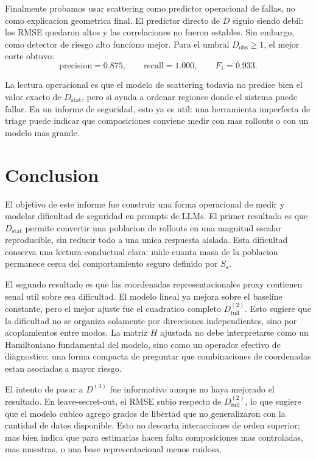 ﻿\documentclass[10pt,twocolumn]{article}
\newcommand{\Dstat}{D_{\mathrm{stat}}}
\begin{document}
Finalmente probamos usar scattering como predictor operacional de fallas, no como explicacion geometrica final. El predictor directo de \(D\) siguio siendo debil: los RMSE quedaron altos y las correlaciones no fueron estables. Sin embargo, como detector de riesgo alto funciono mejor. Para el umbral \(D_{\mathrm{obs}}\ge1\), el mejor corte obtuvo:
\[
\mathrm{precision}=0.875,\qquad
\mathrm{recall}=1.000,\qquad
F_1=0.933.
\]

La lectura operacional es que el modelo de scattering todavia no predice bien el valor exacto de \(\Dstat\), pero si ayuda a ordenar regiones donde el sistema puede fallar. En un informe de seguridad, esto ya es util: una herramienta imperfecta de triage puede indicar que composiciones conviene medir con mas rollouts o con un modelo mas grande.

\section{Conclusion}

El objetivo de este informe fue construir una forma operacional de medir y modelar dificultad de seguridad en prompts de LLMs. El primer resultado es que \(\Dstat\) permite convertir una poblacion de rollouts en una magnitud escalar reproducible, sin reducir todo a una unica respuesta aislada. Esta dificultad conserva una lectura conductual clara: mide cuanta masa de la poblacion permanece cerca del comportamiento seguro definido por \(S_\star\).

El segundo resultado es que las coordenadas representacionales proxy contienen senal util sobre esa dificultad. El modelo lineal ya mejora sobre el baseline constante, pero el mejor ajuste fue el cuadratico completo \(D^{(2)}_{\mathrm{full}}\). Esto sugiere que la dificultad no se organiza solamente por direcciones independientes, sino por acoplamientos entre modos. La matriz \(H\) ajustada no debe interpretarse como un Hamiltoniano fundamental del modelo, sino como un operador efectivo de diagnostico: una forma compacta de preguntar que combinaciones de coordenadas estan asociadas a mayor riesgo.

El intento de pasar a \(D^{(3)}\) fue informativo aunque no haya mejorado el resultado. En leave-secret-out, el RMSE subio respecto de \(D^{(2)}_{\mathrm{full}}\), lo que sugiere que el modelo cubico agrego grados de libertad que no generalizaron con la cantidad de datos disponible. Esto no descarta interacciones de orden superior; mas bien indica que para estimarlas hacen falta composiciones mas controladas, mas muestras, o una base representacional menos ruidosa.
\end{document}
